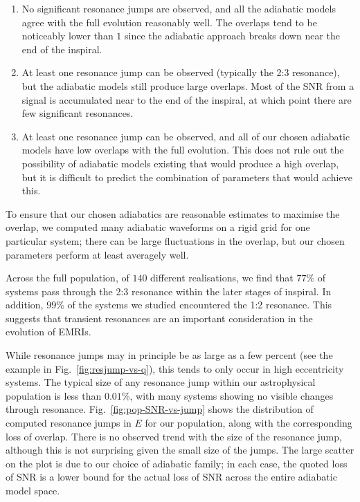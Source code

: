 \documentclass[aps,prd,amsfonts,amssymb,amsmath,nofootinbib,reprint,showpacs,superscriptaddress,twocolumn]{revtex4}
\newcommand{\figref}[1]{Fig.\ \ref{fig:#1}}
\newcommand{\Figref}[1]{Fig.\ \ref{fig:#1}}
\begin{document}
\begin{enumerate}
\item No significant resonance jumps are observed, and all the adiabatic models agree with the full evolution reasonably well. The overlaps tend to be noticeably lower than $1$ since the adiabatic approach breaks down near the end of the inspiral.

\item At least one resonance jump can be observed (typically the 2:3 resonance), but the adiabatic models still produce large overlaps. Most of the SNR from a signal is accumulated near to the end of the inspiral, at which point there are few significant resonances.

\item At least one resonance jump can be observed, and all of our chosen adiabatic models have low overlaps with the full evolution. This does not rule out the possibility of adiabatic models existing that would produce a high overlap, but it is difficult to predict the combination of parameters that would achieve this.
\end{enumerate}

To ensure that our chosen adiabatics are reasonable estimates to maximise the overlap, we computed many adiabatic waveforms on a rigid grid for one particular system; there can be large fluctuations in the overlap, but our chosen parameters perform at least averagely well.

Across the full population, of $140$ different realisations, we find that $77\%$ of systems pass through the 2:3 resonance within the later stages of inspiral. In addition, $99\%$ of the systems we studied encountered the 1:2 resonance. This suggests that transient resonances are an important consideration in the evolution of EMRIs.

While resonance jumps may in principle be as large as a few percent (see the example in \figref{resjump-vs-q}), this tends to only occur in high eccentricity systems. The typical size of any resonance jump within our astrophysical population is less than $0.01\%$, with many systems showing no visible changes through resonance. \Figref{pop-SNR-vs-jump} shows the distribution of computed resonance jumps in $E$ for our population, along with the corresponding loss of overlap. There is no observed trend with the size of the resonance jump, although this is not surprising given the small size of the jumps. The large scatter on the plot is due to our choice of adiabatic family; in each case, the quoted loss of SNR is a lower bound for the actual loss of SNR across the entire adiabatic model space.
\end{document}
